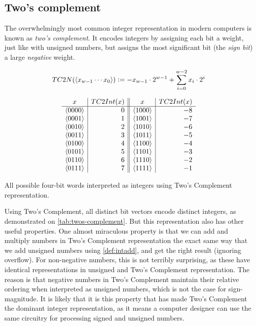\subsection{Two's complement}
\label{sec:twos-complement}

The overwhelmingly most common integer representation in modern
computers is known as \emph{two's complement}.  It encodes integers by
assigning each bit a weight, just like with unsigned numbers, but
assigns the most significant bit (the \emph{sign bit}) a large
\emph{negative} weight.

\begin{definition}
\begin{align*}
    TC2N(\langle x_{w-1}\cdots x_{0} \rangle) \vcentcolon= -x_{w-1}\cdot 2^{w-1} + \sum_{i=0}^{w-2} x_{i} \cdot{} 2^{i}
\end{align*}
\label{def:tc2n}
\end{definition}

\begin{table}
  \centering
  \[
  \begin{array}{c|r||c|r}
    x & TC2Int(x) & x & TC2Int(x) \\\hline
    \langle 0000 \rangle & 0 & \langle 1000 \rangle & -8 \\
    \langle 0001 \rangle & 1 & \langle 1001 \rangle & -7 \\
    \langle 0010 \rangle & 2 & \langle 1010 \rangle & -6 \\
    \langle 0011 \rangle & 3 & \langle 1011 \rangle & -5 \\
    \langle 0100 \rangle & 4 & \langle 1100 \rangle & -4 \\
    \langle 0101 \rangle & 5 & \langle 1101 \rangle & -3 \\
    \langle 0110 \rangle & 6 & \langle 1110 \rangle & -2 \\
    \langle 0111 \rangle & 7 & \langle 1111 \rangle & -1 \\
  \end{array}
  \]
  \caption{All possible four-bit words interpreted as integers using
    Two's Complement representation.}
  \label{tab:twos-complement}
\end{table}

Using Two's Complement, all distinct bit vectors encode distinct
integers, as demonstrated on \cref{tab:twos-complement}.  But this
representation also has other useful properties.  One almost
miraculous property is that we can add and multiply numbers in Two's
Complement representation the exact same way that we add unsigned
numbers using \cref{def:intadd}, and get the right result (ignoring
overflow).  For non-negative numbers, this is not terribly surprising,
as these have identical representations in unsigned and Two's
Complement representation.  The reason is that negative numbers in
Two's Complement maintain their relative ordering when interpreted as
unsigned numbers, which is not the case for sign-magnitude.  It is
likely that it is this property that has made Two's Complement the
dominant integer representation, as it means a computer designer can
use the same circuitry for processing signed and unsigned numbers.

